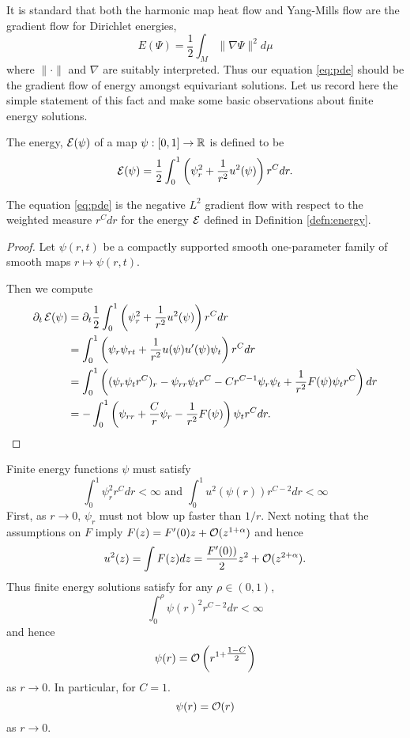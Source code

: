 \documentclass{amsart}
\begin{document}
It is standard that both the harmonic map heat flow and Yang-Mills flow are the gradient flow for Dirichlet energies,
\[
E(\Psi) = \frac{1}{2} \int_M \|\nabla \Psi\|^2 d\mu
\]
where \(\|\cdot\|\) and \(\nabla\) are suitably interpreted. Thus our equation \eqref{eq:pde} should be the gradient flow of energy amongst equivariant solutions. Let us record here the simple statement of this fact and make some basic observations about finite energy solutions.

\begin{defn}
\label{defn:energy}
The energy, \(\operatorname{\mathcal{E}}(\psi)\) of a map \(\psi: [0, 1] \to \mathbb{R}\) is defined to be
\[
\operatorname{\mathcal{E}}(\psi) = \frac{1}{2} \int_0^1 \left(\psi_r^2 + \frac{1}{r^2} u^2(\psi)\right) r^C dr.
\]
\end{defn}

\begin{lemma}
The equation \eqref{eq:pde} is the negative \(L^2\) gradient flow with respect to the weighted measure \(r^C dr\) for the energy \(\operatorname{\mathcal{E}}\) defined in Definition \ref{defn:energy}.
\end{lemma}

\begin{proof}
Let \(\psi(r, t)\) be a compactly supported smooth one-parameter family of smooth maps \(r \mapsto \psi(r, t)\).

Then we compute
\[
\begin{split}
\partial_t \operatorname{\mathcal{E}}(\psi) &= \partial_t \frac{1}{2} \int_0^1  \left(\psi_r^2 + \frac{1}{r^2} u^2(\psi)\right) r^C dr \\
&= \int_0^1  \left(\psi_r \psi_{rt} + \frac{1}{r^2} u(\psi)u'(\psi) \psi_t \right) r^C dr \\
&= \int_0^1 \left((\psi_r \psi_t r^C)_r - \psi_{rr} \psi_t r^C - C r^{C-1} \psi_r \psi_t + \frac{1}{r^2} F(\psi) \psi_t r^C\right) dr \\
&= - \int_0^1 \left(\psi_{rr} + \frac{C}{r} \psi_r - \frac{1}{r^2} F(\psi)\right) \psi_t r^C dr.
\end{split}
\]
\end{proof}

\begin{rem}
\label{rem:finite_energy}

Finite energy functions \(\psi\) must satisfy
\[
\int_0^1 \psi_r^2 r^C dr < \infty \text{ and } \int_0^1 u^2(\psi(r)) r^{C-2} dr < \infty
\]
First, as \(r\to 0\), \(\psi_r\) must not blow up faster than \(1/r\). Next noting that the assumptions on \(F\) imply \(F(z) = F'(0) z + \operatorname{\mathcal{O}}(z^{1+\alpha})\) and hence
\[
u^2(z) = \int F(z) dz = \frac{F'(0))}{2} z^2 + \operatorname{\mathcal{O}}(z^{2+\alpha}).
\]
Thus finite energy solutions satisfy for any \(\rho \in (0, 1)\),
\[
\int_0^{\rho} \psi(r)^2 r^{C-2} dr < \infty
\]
and hence
\[
\psi(r) = \operatorname{\mathcal{O}}\left(r^{1 + \tfrac{1-C}{2}}\right)
\]
as \(r \to 0\). In particular, for \(C = 1\).
\[
\psi(r) = \operatorname{\mathcal{O}}(r)
\]
as \(r \to 0\).
\end{rem}
\end{document}
